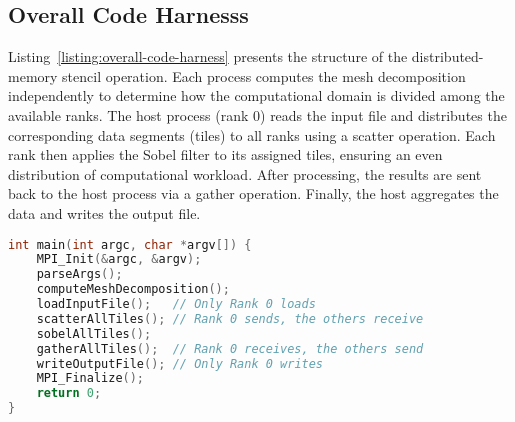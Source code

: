 \subsection{Overall Code Harnesss}
\label{subsec:overall-code-harness}

Listing~\ref{listing:overall-code-harness} presents the structure of the distributed-memory stencil operation. Each process computes the mesh decomposition independently to determine how the computational domain is divided among the available ranks. The host process (rank 0) reads the input file and distributes the corresponding data segments (tiles) to all ranks using a scatter operation. Each rank then applies the Sobel filter to its assigned tiles, ensuring an even distribution of computational workload. After processing, the results are sent back to the host process via a gather operation. Finally, the host aggregates the data and writes the output file.

\begin{lstlisting}[caption={\textbf{Overall code harness of the distributed-memory stencil operations with MPI.}},label={listing:overall-code-harness},float=htbp,style=mystyle,language=C++]
int main(int argc, char *argv[]) {
    MPI_Init(&argc, &argv);
    parseArgs();
    computeMeshDecomposition();
    loadInputFile();   // Only Rank 0 loads 
    scatterAllTiles(); // Rank 0 sends, the others receive
    sobelAllTiles();
    gatherAllTiles();  // Rank 0 receives, the others send
    writeOutputFile(); // Only Rank 0 writes
    MPI_Finalize();
    return 0;
}
\end{lstlisting}
